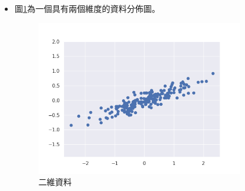 \begin{itemize}
	\item
	      圖\ref{fig:pca_demostrate}為一個具有兩個維度的資料分佈圖。
	      \begin{figure}[h]
		      \centering
		      \includegraphics[width=9cm]{pic/pca_demostrate.png}
		      \caption{二維資料}
		      \label{fig:pca_demostrate}


	      \end{figure}



\end{itemize}
